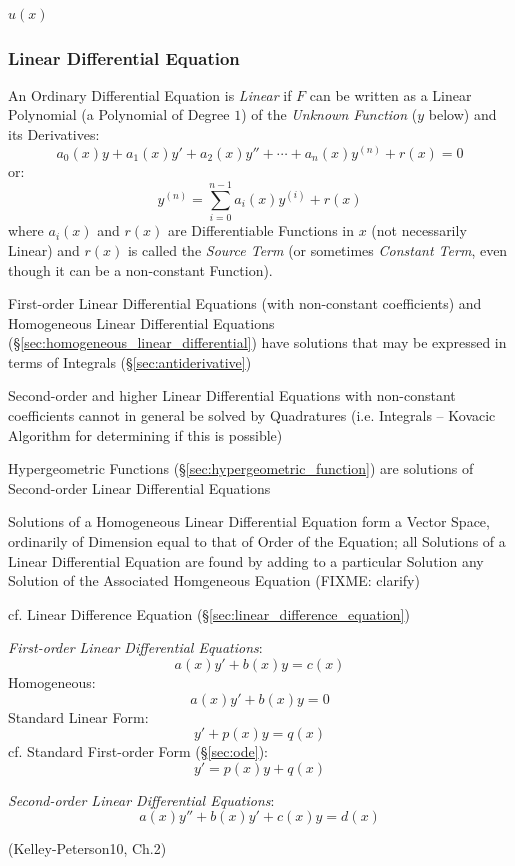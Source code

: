 {$u(x)$



\subsubsection{Linear Differential Equation}
\label{sec:linear_differential_equation}

An Ordinary Differential Equation is \emph{Linear} if $F$ can be written as a
Linear Polynomial (a Polynomial of Degree $1$) of the \emph{Unknown Function}
($y$ below) and its Derivatives:
\[
  a_0(x)y + a_1(x)y' + a_2(x)y'' + \cdots + a_n(x)y^{(n)} + r(x) = 0
\]
or:
\[
  y^{(n)} = \sum_{i=0}^{n-1} a_i(x) y^{(i)} + r(x)
\]
where $a_i(x)$ and $r(x)$ are Differentiable Functions in $x$ (not necessarily
Linear) and $r(x)$ is called the \emph{Source Term} (or sometimes
\emph{Constant Term}, even though it can be a non-constant Function).

First-order Linear Differential Equations (with non-constant coefficients) and
Homogeneous Linear Differential Equations
(\S\ref{sec:homogeneous_linear_differential}) have solutions that may
be expressed in terms of Integrals (\S\ref{sec:antiderivative})

Second-order and higher Linear Differential Equations with non-constant
coefficients cannot in general be solved by Quadratures (i.e. Integrals --
Kovacic Algorithm for determining if this is possible)

Hypergeometric Functions (\S\ref{sec:hypergeometric_function}) are solutions of
Second-order Linear Differential Equations

Solutions of a Homogeneous Linear Differential Equation form a Vector Space,
ordinarily of Dimension equal to that of Order of the Equation; all Solutions
of a Linear Differential Equation are found by adding to a particular Solution
any Solution of the Associated Homgeneous Equation (FIXME: clarify)

cf. Linear Difference Equation (\S\ref{sec:linear_difference_equation})

\emph{First-order Linear Differential Equations}:
\[
  a(x) y' + b(x) y = c(x)
\]
Homogeneous:
\[
  a(x) y' + b(x) y = 0
\]
Standard Linear Form:
\[
  y' + p(x) y = q(x)
\]
cf. Standard First-order Form (\S\ref{sec:ode}):
\[
  y' = p(x) y + q(x)
\]

\emph{Second-order Linear Differential Equations}:
\[
  a(x) y'' + b(x) y' + c(x) y = d(x)
\]

\asterism

(Kelley-Peterson10, Ch.2)

}
